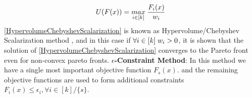 \begin{equation} \label{HypervolumeChebyshevScalarization}
    U(F(x)) = \underset{i\in [k]}{max}\hspace{1mm} \frac{F_i(x)}{w_i}
\end{equation}
\newline \ref{HypervolumeChebyshevScalarization} is known as Hypervolume/Chebyshev Scalarization method \cite{zhang2020random}, and in this case if $\forall i \in [k] \hspace{1mm} w_i>0$, it is shown that the solution of \ref{HypervolumeChebyshevScalarization} converges to the Pareto front even for non-convex pareto fronts.
\newline \newline \textbf{$\epsilon$-Constraint Method}:
In this method\cite{haimes1971bicriterion} we have a single most important objective function $F_s(x)$. and the remaining objective functions are used to form additional constraints $F_i(x) \le \epsilon_i,\forall i \in [k]/\{s\}$.

